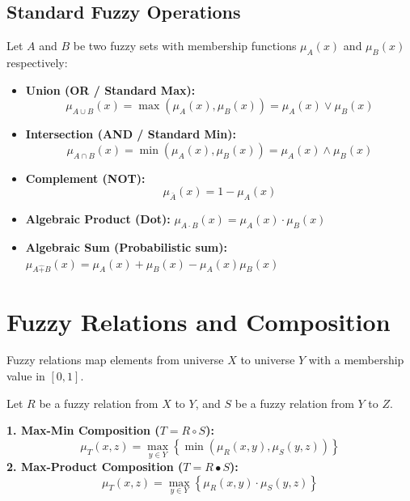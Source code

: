 \documentclass[12pt,a4paper]{article}
\begin{document}
\subsection{Standard Fuzzy Operations}
Let $A$ and $B$ be two fuzzy sets with membership functions $\mu_A(x)$ and $\mu_B(x)$ respectively:
\begin{itemize}[leftmargin=*, itemsep=3.5pt]
  \item \textbf{Union (OR / Standard Max):}
    \begin{equation}
      \mu_{A \cup B}(x) = \max\left( \mu_A(x), \mu_B(x) \right) = \mu_A(x) \lor \mu_B(x)
    \end{equation}
  \item \textbf{Intersection (AND / Standard Min):}
    \begin{equation}
      \mu_{A \cap B}(x) = \min\left( \mu_A(x), \mu_B(x) \right) = \mu_A(x) \land \mu_B(x)
    \end{equation}
  \item \textbf{Complement (NOT):}
    \begin{equation}
      \mu_{\bar{A}}(x) = 1 - \mu_A(x)
    \end{equation}
  \item \textbf{Algebraic Product (Dot):} $\mu_{A \cdot B}(x) = \mu_A(x) \cdot \mu_B(x)$
  \item \textbf{Algebraic Sum (Probabilistic sum):} $\mu_{A \hat{+} B}(x) = \mu_A(x) + \mu_B(x) - \mu_A(x)\mu_B(x)$
\end{itemize}

\section{Fuzzy Relations and Composition}

Fuzzy relations map elements from universe $X$ to universe $Y$ with a membership value in $[0, 1]$.

\begin{tcolorbox}[formulabox, title={Fuzzy Compositions}]
Let $R$ be a fuzzy relation from $X$ to $Y$, and $S$ be a fuzzy relation from $Y$ to $Z$.
\par\vspace{4pt}
\textbf{1. Max-Min Composition ($T = R \circ S$):}
\begin{equation}
  \mu_T(x, z) = \max_{y \in Y} \left\{ \min\left( \mu_R(x,y), \mu_S(y,z) \right) \right\}
\end{equation}
\textbf{2. Max-Product Composition ($T = R \bullet S$):}
\begin{equation}
  \mu_T(x, z) = \max_{y \in Y} \left\{ \mu_R(x,y) \cdot \mu_S(y,z) \right\}
\end{equation}
\end{tcolorbox}
\end{document}
